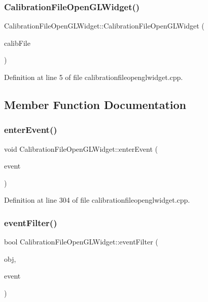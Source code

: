 \subsubsection{\texorpdfstring{CalibrationFileOpenGLWidget()}{CalibrationFileOpenGLWidget()}}
{\footnotesize\ttfamily Calibration\+File\+Open\+G\+L\+Widget\+::\+Calibration\+File\+Open\+G\+L\+Widget (\begin{DoxyParamCaption}\item[{\mbox{\hyperlink{class_calibration_file}{Calibration\+File}} $\ast$}]{calib\+File }\end{DoxyParamCaption})}



Definition at line 5 of file calibrationfileopenglwidget.\+cpp.



\subsection{Member Function Documentation}
\mbox{\label{class_calibration_file_open_g_l_widget_a0b2b37302cfee8469ffb98aee4bf473a}} 
\subsubsection{\texorpdfstring{enterEvent()}{enterEvent()}}
{\footnotesize\ttfamily void Calibration\+File\+Open\+G\+L\+Widget\+::enter\+Event (\begin{DoxyParamCaption}\item[{Q\+Event $\ast$}]{event }\end{DoxyParamCaption})\hspace{0.3cm}{\ttfamily [protected]}}



Definition at line 304 of file calibrationfileopenglwidget.\+cpp.

\mbox{\label{class_calibration_file_open_g_l_widget_a3dc3e4b6228a493a482acab878277c7a}} 
\subsubsection{\texorpdfstring{eventFilter()}{eventFilter()}}
{\footnotesize\ttfamily bool Calibration\+File\+Open\+G\+L\+Widget\+::event\+Filter (\begin{DoxyParamCaption}\item[{Q\+Object $\ast$}]{obj,  }\item[{Q\+Event $\ast$}]{event }\end{DoxyParamCaption})\hspace{0.3cm}{\ttfamily [protected]}}



